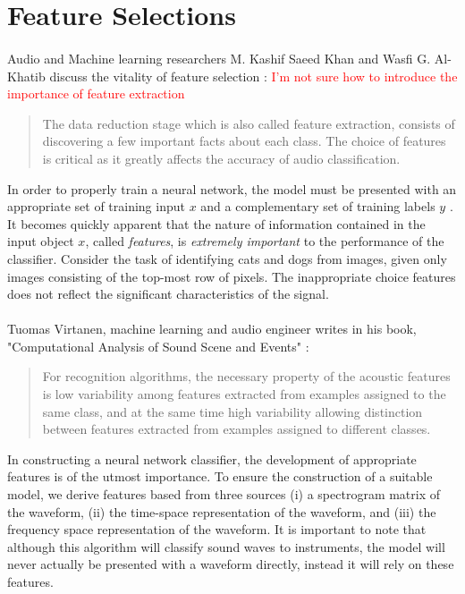 \documentclass[12pt,letterpaper]{article}
\begin{document}

\newpage
\section{Feature Selections}
\label{sec-Features}

\paragraph*{}Audio and Machine learning researchers M. Kashif Saeed Khan and Wasfi G. Al-Khatib discuss the vitality of feature selection \cite{Khan}: \textcolor{red}{I'm not sure how to introduce the importance of feature extraction}
\begin{quote}
The data reduction stage which is also called feature extraction, consists of discovering a few important facts about each class. The choice of features is critical as it greatly affects the accuracy of audio classification. 
\end{quote}
In order to properly train a neural network, the model must be presented with an appropriate set of training input $x$ and a complementary set of training labels $y$ \cite{Geron,Goodfellow,James}. It becomes quickly apparent that the nature of information contained in the input object $x$, called \textit{features}, is \textit{extremely important} to the performance of the classifier. Consider the task of identifying cats and dogs from images, given only images consisting of the top-most row of pixels. The inappropriate choice features does not reflect the significant characteristics of the signal.

\paragraph*{}Tuomas Virtanen, machine learning and audio engineer writes in his book, "Computational Analysis of Sound Scene and Events" \cite{Virtanen}:
\begin{quote}
For recognition algorithms, the necessary property of the acoustic features is low variability among features extracted from examples assigned to the same class, and at the same time high variability allowing distinction between features extracted from examples assigned to different classes.
\end{quote}
In constructing a neural network classifier, the development of appropriate features is of the utmost importance. To ensure the construction of a suitable model, we derive features based from three sources (i) a spectrogram matrix of the waveform, (ii) the time-space representation of the waveform, and (iii) the frequency space representation of the waveform. It is important to note that although this algorithm will classify sound waves to instruments, the model will never actually be presented with a waveform directly, instead it will rely on these features.
\end{document}
